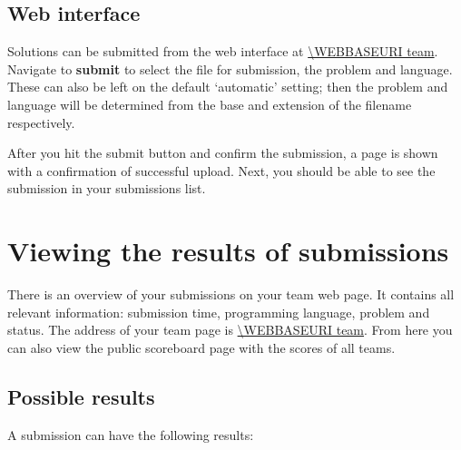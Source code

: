 \subsection{Web interface}

Solutions can be submitted from the web interface at \url{\WEBBASEURI team}.
Navigate to \textbf{submit} to select the file for
submission, the problem and language. These can also be left on the
default `automatic' setting; then the problem and language will be
determined from the base and extension of the filename respectively.

After you hit the submit button and confirm the submission, a page is
shown with a confirmation of successful upload. Next, you should be
able to see the submission in your submissions list.

\section{Viewing the results of submissions}

There is an overview of your submissions on your team web page.
It contains all relevant information: submission time, programming
language, problem and status. The address of your team page is
\url{\WEBBASEURI team}. From here you can also view the public
scoreboard page with the scores of all teams.

\subsection{Possible results}

A submission can have the following results:

